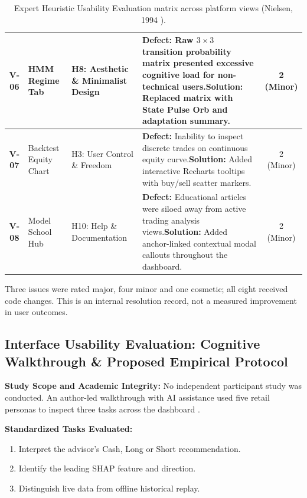 \documentclass[11pt,a4paper]{article}
\begin{document}
\begin{table}[H]
\begin{tabularx}{\textwidth}{c p{2.8cm} p{2.7cm} X c}
\midrule
\textbf{V-06} & HMM Regime Tab & H8: Aesthetic \& Minimalist Design & \textbf{Defect:} Raw $3 \times 3$ transition probability matrix presented excessive cognitive load for non-technical users.\newline \textbf{Solution:} Replaced matrix with State Pulse Orb and adaptation summary. & 2 (Minor) \\
\midrule
\textbf{V-07} & Backtest Equity Chart & H3: User Control \& Freedom & \textbf{Defect:} Inability to inspect discrete trades on continuous equity curve.\newline \textbf{Solution:} Added interactive Recharts tooltips with buy/sell scatter markers. & 2 (Minor) \\
\midrule
\textbf{V-08} & Model School Hub & H10: Help \& Documentation & \textbf{Defect:} Educational articles were siloed away from active trading analysis views.\newline \textbf{Solution:} Added anchor-linked contextual modal callouts throughout the dashboard. & 2 (Minor) \\
\bottomrule
\end{tabularx}
\caption{Expert Heuristic Usability Evaluation matrix across platform views (Nielsen, 1994 \cite{nielsen1994}).}
\label{tab:heuristic_matrix}
\end{table}

Three issues were rated major, four minor and one cosmetic; all eight received code changes. This is an internal resolution record, not a measured improvement in user outcomes.

\subsection{Interface Usability Evaluation: Cognitive Walkthrough \& Proposed Empirical Protocol}
\label{sec:user_study}
\textbf{Study Scope and Academic Integrity:}
No independent participant study was conducted. An author-led walkthrough with AI assistance used five retail personas to inspect three tasks across the dashboard \cite{wharton1994,nielsen1994}.

\textbf{Standardized Tasks Evaluated:}
\begin{enumerate}[leftmargin=2em]
    \item Interpret the advisor's Cash, Long or Short recommendation.
    \item Identify the leading SHAP feature and direction.
    \item Distinguish live data from offline historical replay.
\end{enumerate}
\end{document}

